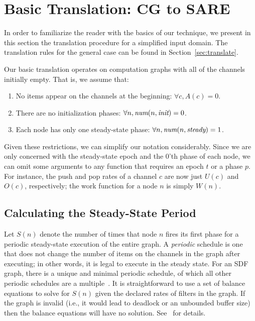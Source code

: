 \section{Basic Translation: CG to SARE}
\label{sec:simple}

In order to familiarize the reader with the basics of our technique,
we present in this section the translation procedure for a simplified
input domain.  The translation rules for the general case can be found
in Section~\ref{sec:translate}.

Our basic translation operates on computation graphs with all of the
channels initially empty.  That is, we assume that:
\begin{enumerate}

\item No items appear on the channels at the beginning:  $\forall c, A(c) = 0$.

\item There are no initialization phases: $\forall n, \mbox{\it num}(n, \mbox{\it init}) = 0$.

\item Each node has only one steady-state phase: $\forall n, \mbox{\it num}(n, \mbox{\it steady}) = 1$.

\end{enumerate}

Given these restrictions, we can simplify our notation considerably.
Since we are only concerned with the steady-state epoch and the 0'th
phase of each node, we can omit some arguments to any function that
requires an epoch $t$ or a phase $p$.  For instance, the push and pop
rates of a channel $c$ are now just $U(c)$ and $O(c)$, respectively;
the work function for a node $n$ is simply $W(n)$.

\subsection{Calculating the Steady-State Period}
\label{sec:balance}

Let $S(n)$ denote the number of times that node $n$ fires its first
phase for a periodic steady-state execution of the entire graph. A
{\it periodic} schedule is one that does not change the number of
items on the channels in the graph after executing; in other words, it
is legal to execute in the steady state.  For an SDF graph, there is a
unique and minimal periodic schedule, of which all other periodic
schedules are a multiple~\cite{leesdf}.  It is straightforward to use
a set of balance equations to solve for $S(n)$ given the declared
rates of filters in the graph.  If the graph is invalid (i.e., it
would lead to deadlock or an unbounded buffer size) then the balance
equations will have no solution.  See~\cite{leesdf} for details.

